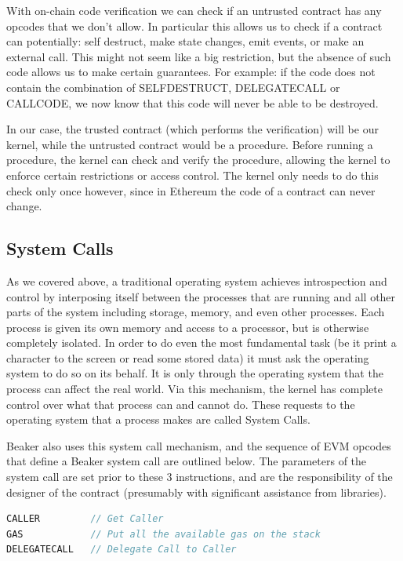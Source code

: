 \documentclass[english,a4paper]{article}
\begin{document}
With on-chain code verification we can check if an untrusted contract has any
opcodes that we
don't allow. In particular this allows us to check if a
contract can potentially: self destruct, make state changes, emit events,
or make an external call. This might not seem like a big restriction, but the
absence of
such code allows us to make certain guarantees. For example: if the code
does not contain the combination of SELFDESTRUCT, DELEGATECALL or
CALLCODE, we now know that this code will never be able to be destroyed.

In our case, the trusted contract (which performs the verification) will be our
kernel, while the
untrusted contract would be a procedure. Before running a procedure, the
kernel can check and verify the procedure, allowing the kernel to
enforce certain restrictions or access control. The kernel only needs to
do this check only once however, since in Ethereum the code of a
contract can never change.

\subsection{System Calls}\label{system-calls}
As we covered above, a traditional operating system achieves
introspection and control by interposing itself between the processes
that are running and all other parts of the system including storage,
memory, and even other processes. Each process is given its own memory
and access to a processor, but is otherwise completely isolated. In
order to do even the most fundamental task (be it print a character to
the screen or read some stored data) it must ask the operating system to
do so on its behalf. It is only through the operating system that the
process can affect the real world. Via this mechanism, the kernel has
complete control over what that process can and cannot do. These
requests to the operating system that a process makes are called System
Calls.

Beaker also uses this system call mechanism, and the sequence of EVM opcodes
that define a Beaker system call are outlined below. The
parameters of the system call are set prior to these 3 instructions, and are the
responsibility of the designer of the contract (presumably with significant
assistance from libraries).

\begin{minipage}{\linewidth}
\begin{lstlisting}[language=c,commentstyle=\color{mygreen},basicstyle=\ttfamily,
  identifierstyle=\color{blue},
  caption=Sequence of steps to perform a system call.]
CALLER         // Get Caller
GAS            // Put all the available gas on the stack
DELEGATECALL   // Delegate Call to Caller
\end{lstlisting}
\end{minipage}
\end{document}
